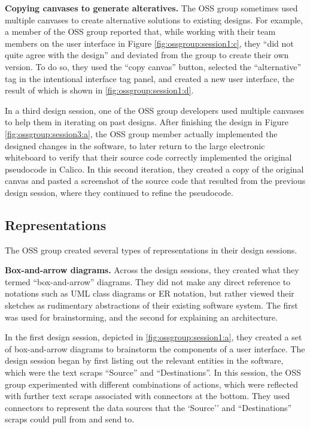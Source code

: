 \documentclass[12pt,fleqn]{ucithesis}
\begin{document}
\textbf{Copying canvases to generate alteratives. } The OSS group sometimes used multiple canvases to create alternative solutions to existing designs. For example, a member of the OSS group reported that, while working with their team members on the user interface in Figure \ref{fig:ossgroup:session1:c}, they ``did not quite agree with the design'' and deviated from the group to create their own version. To do so, they used the ``copy canvas'' button, selected the ``alternative'' tag in the intentional interface tag panel, and created a new user interface, the result of which is shown in  \ref{fig:ossgroup:session1:d}. 

In a third design session, one of the OSS group developers used multiple canvases to help them in iterating on past designs. After finishing the design in Figure \ref{fig:ossgroup:session3:a}, the OSS group member actually implemented the designed changes in the software, to later return to the large electronic whiteboard to verify that their source code correctly implemented the original pseudocode in Calico. In this second iteration, they created a copy of the original canvas and pasted a screenshot of the source code that resulted from the previous design session, where they continued to refine the pseudocode.

\subsection{Representations}

The OSS group created several types of representations in their design sessions.

\textbf{Box-and-arrow diagrams. } Across the design sessions, they created what they termed ``box-and-arrow'' diagrams. They did not make any direct reference to notations such as UML class diagrams or ER notation, but rather viewed their sketches as rudimentary abstractions of their existing software system. The first was used for brainstorming, and the second for explaining an architecture.

In the first design session, depicted in \ref{fig:ossgroup:session1:a}, they created a set of box-and-arrow diagrams to brainstorm the components of a user interface. The design session began by first listing out the relevant entities in the software, which were the text scraps ``Source'' and ``Destinations''. In this session, the OSS group experimented with different combinations of actions, which were reflected with further text scraps associated with connectors at the bottom. They used connectors to represent the data sources that the `Source'' and ``Destinations'' scraps could pull from and send to.
\end{document}
